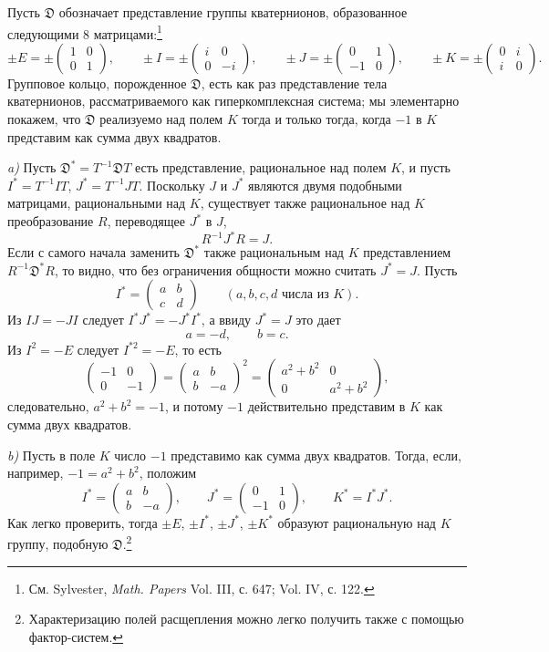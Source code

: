 \documentclass[11pt]{article}
\newcommand{\mat}[1]{\begin{pmatrix}#1\end{pmatrix}}
\begin{document}
\noindent Пусть $\mathfrak{D}$ обозначает представление группы кватернионов, образованное следующими 8 матрицами:\footnote{См. Sylvester, \emph{Math. Papers} Vol. III, с. 647; Vol. IV, с. 122.}
\[
\pm E=\pm\mat{1&0\\0&1},\qquad
\pm I=\pm\mat{i&0\\0&-i},\qquad
\pm J=\pm\mat{0&1\\-1&0},\qquad
\pm K=\pm\mat{0&i\\ i&0}.
\]
Групповое кольцо, порожденное $\mathfrak{D}$, есть как раз представление тела кватернионов, рассматриваемого как гиперкомплексная система; мы элементарно покажем, что $\mathfrak{D}$ реализуемо над полем $K$ тогда и только тогда, когда $-1$ в $K$ представим как сумма двух квадратов.

\medskip

\noindent \emph{a)} Пусть $\mathfrak{D}^*=T^{-1}\mathfrak{D}T$ есть представление, рациональное над полем $K$, и пусть $I^*=T^{-1}IT$, $J^*=T^{-1}JT$. Поскольку $J$ и $J^*$ являются двумя подобными матрицами, рациональными над $K$, существует также рациональное над $K$ преобразование $R$, переводящее $J^*$ в $J$,
\[
        R^{-1}J^*R=J.
\]
Если с самого начала заменить $\mathfrak{D}^*$ также рациональным над $K$ представлением $R^{-1}\mathfrak{D}^*R$, то видно, что без ограничения общности можно считать $J^*=J$. Пусть
\[
        I^*=\mat{a&b\\ c&d}\qquad (a,b,c,d\text{ числа из }K).
\]
Из $IJ=-JI$ следует $I^*J^*=-J^*I^*$, а ввиду $J^*=J$ это дает
\[
        a=-d,
        \qquad b=c.
\]
Из $I^2=-E$ следует $I^{*2}=-E$, то есть
\[
        \mat{-1&0\\0&-1}=\mat{a&b\\ b&-a}^2
        =\mat{a^2+b^2&0\\0&a^2+b^2},
\]
следовательно, $a^2+b^2=-1$, и потому $-1$ действительно представим в $K$ как сумма двух квадратов.

\medskip

\noindent \emph{b)} Пусть в поле $K$ число $-1$ представимо как сумма двух квадратов. Тогда, если, например, $-1=a^2+b^2$, положим
\[
        I^*=\mat{a&b\\ b&-a},\qquad
        J^*=\mat{0&1\\-1&0},\qquad
        K^*=I^*J^*.
\]
Как легко проверить, тогда $\pm E$, $\pm I^*$, $\pm J^*$, $\pm K^*$ образуют рациональную над $K$ группу, подобную $\mathfrak{D}$.\footnote{Характеризацию полей расщепления можно легко получить также с помощью фактор-систем.}
\end{document}
